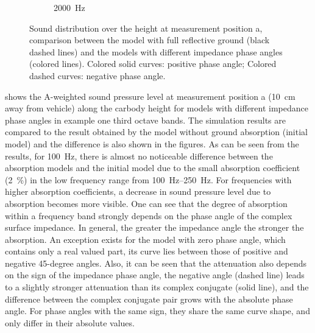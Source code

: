 \begin{figure}
\begin{subfigure}[b]{\textwidth}
		\caption{\SI{2000}{\hertz}}
	\end{subfigure}

	\caption{Sound distribution over the height at measurement position a, comparison between the model with full reflective ground (black dashed lines) and the models with different impedance phase angles (colored lines). Colored solid curves: positive phase angle; Colored dashed curves: negative phase angle.}
	\label{fig:third_octave_over_height_impedance}
\end{figure}

 shows the A-weighted sound pressure level at measurement position a (\SI{10}{\centi\meter} away from vehicle) along the carbody height for models with different impedance phase angles in example one third octave bands. The simulation results are compared to the result obtained by the model without ground absorption (initial model) and the difference is also shown in the figures.
As can be seen from the results, for \SI{100}{\hertz}, there is almost no noticeable difference between the absorption models and the initial model due to the small absorption coefficient (\SI{2}{\percent}) in the low frequency range from \SIrange{100}{250}{\hertz}. For frequencies with higher absorption coefficients, a decrease in sound pressure level due to absorption becomes more visible. One can see that the degree of absorption within a frequency band strongly depends on the phase angle of the complex surface impedance. In general, the greater the impedance angle the stronger the absorption. An exception exists for the model with zero phase angle, which contains only a real valued part, its curve lies between those of positive and negative 45-degree angles. Also, it can be seen that the attenuation also depends on the sign of the impedance phase angle, the negative angle (dashed line) leads to a slightly stronger attenuation than its complex conjugate (solid line), and the difference between the complex conjugate pair grows with the absolute phase angle. For phase angles with the same sign, they share the same curve shape, and only differ in their absolute values.

